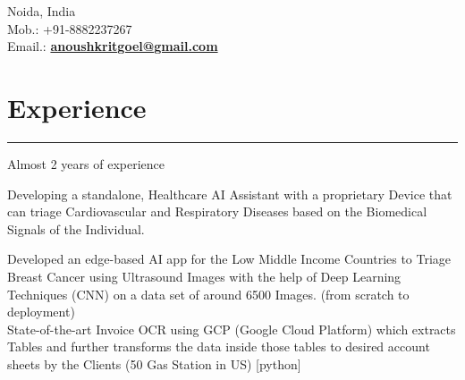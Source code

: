 \documentclass[]{rahulworld-resume}
\begin{document}
\hfill
\begin{minipage}[t]{0.66\textwidth}
\hspace*{0pt}\hfill \\
\hspace*{0pt}\hfill \\
\hspace*{0pt}\hfill Noida, India \\
\hspace*{0pt}\hfill Mob.: +91-8882237267 \\
\hspace*{0pt}\hfill Email.: \textbf{\href{mailto:anoushkritgoel@gmail.com}{anoushkritgoel@gmail.com}} \\

\section{Experience}
\noindent\rule{12.5cm}{0.4pt}
Almost 2 years of experience \\

 
\hspace{5em}%
\begin{minipage}{1.00\textwidth\vspace{2pt}}
Developing a standalone, Healthcare AI Assistant with a proprietary Device that can triage Cardiovascular and Respiratory Diseases based on the Biomedical Signals of the Individual.
\end{minipage}

\sectionsep

 
\hspace{5em}
\begin{minipage}{1.00\textwidth\vspace{2pt}}
Developed an edge-based AI app for the Low Middle Income Countries to Triage Breast Cancer using Ultrasound Images with the help of Deep Learning Techniques (CNN) on a data set of around 6500 Images. (from scratch to deployment) \\

State-of-the-art Invoice OCR using GCP (Google Cloud Platform) which extracts Tables and further transforms the data inside those tables to desired account sheets by the Clients (50 Gas Station in US) [python]
\end{minipage}
\sectionsep


\end{minipage}
\end{document}
